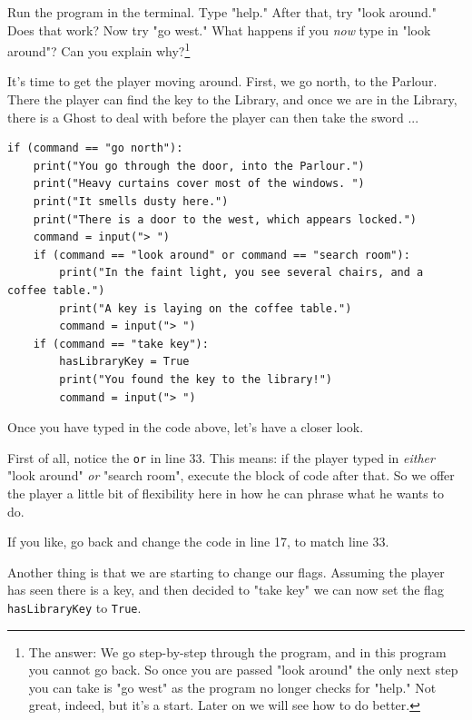 \begin{Exe}\label{exe:fixedorder}
Run the program in the terminal. Type "help." After that, try "look around." Does that work? Now try "go west." What happens if you \emph{now} type in "look around"? Can you explain why?\footnote{The answer: We go step-by-step through the program, and in this program you cannot go back. So once you are passed "look around" the only next step you can take is "go west" as the program no longer checks for "help." Not great, indeed, but it's a start. Later on we will see how to do better.} \expend
\end{Exe}

It's time to get the player moving around. First, we go north, to the Parlour. There the player can find the key to the Library, and once we are in the Library, there is a Ghost to deal with before the player can then take the sword ... 

\begin{lstlisting}[firstnumber=last]
if (command == "go north"):
    print("You go through the door, into the Parlour.")
    print("Heavy curtains cover most of the windows. ")
    print("It smells dusty here.")
    print("There is a door to the west, which appears locked.")
    command = input("> ")
    if (command == "look around" or command == "search room"):
        print("In the faint light, you see several chairs, and a coffee table.")
        print("A key is laying on the coffee table.")
        command = input("> ")
    if (command == "take key"):
        hasLibraryKey = True
        print("You found the key to the library!")
        command = input("> ")
\end{lstlisting}
 
Once you have typed in the code above, let's have a closer look. 

First of all, notice the \texttt{or} in line 33. This means: if the player typed in \emph{either} "look around" \emph{or} "search room", execute the block of code after that. So we offer the player a little bit of flexibility here in how he can phrase what he wants to do. 

\begin{Exe}
If you like, go back and change the code in line 17, to match line 33. \expend 
\end{Exe}

Another thing is that we are starting to change our flags. Assuming the player has seen there is a key, and then decided to "take key" we can now set the flag \texttt{hasLibraryKey} to \texttt{True}. 

